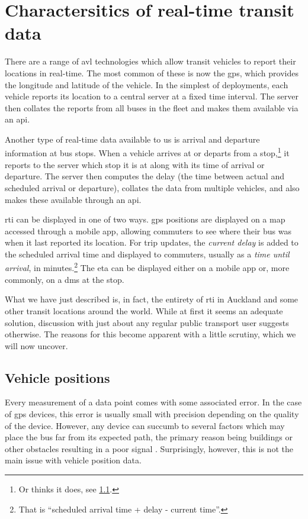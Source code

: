 \section{Charactersitics of real-time transit data}
\label{sec:realtime-data}

There are a range of \gls{avl} technologies which allow transit vehicles to report their locations in real-time. The most common of these is now the \gls{gps}, which provides the longitude and latitude of the vehicle. In the simplest of deployments, each vehicle reports its location to a central server at a fixed time interval. The server then collates the reports from all buses in the fleet and makes them available via an \gls{api}.


Another type of real-time data available to us is arrival and departure information at bus stops. When a vehicle arrives at or departs from a stop,\footnote{Or thinks it does, see \cref{sec:vp_data}.} it reports to the server which stop it is at along with its time of arrival or departure. The server then computes the delay (the time between actual and scheduled arrival or departure), collates the data from multiple vehicles, and also makes these available through an \gls{api}.


\Gls{rti} can be displayed in one of two ways. \Gls{gps} positions are displayed on a map accessed through a mobile app, allowing commuters to see where their bus was when it last reported its location. For trip updates, the \emph{current delay} is added to the scheduled arrival time and displayed to commuters, usually as a \emph{time until arrival}, in minutes.\footnote{That is ``scheduled arrival time + delay - current time''.} The \gls{eta} can be displayed either on a mobile app or, more commonly, on a \gls{dms} at the stop.


What we have just described is, in fact, the entirety of \gls{rti} in Auckland and some other transit locations around the world. While at first it seems an adequate solution, discussion with just about any regular public transport user suggests otherwise. The reasons for this become apparent with a little scrutiny, which we will now uncover.


\subsection{Vehicle positions}
\label{sec:vp_data}

Every measurement of a data point comes with some associated error. In the case of \gls{gps} devices, this error is usually small with precision depending on the quality of the device. However, any device can succumb to several factors which may place the bus far from its expected path, the primary reason being buildings or other obstacles resulting in a poor signal \citep{Xinghao_2013,Mutambara_2000,Zhao_1997}. Surprisingly, however, this is not the main issue with vehicle position data.


